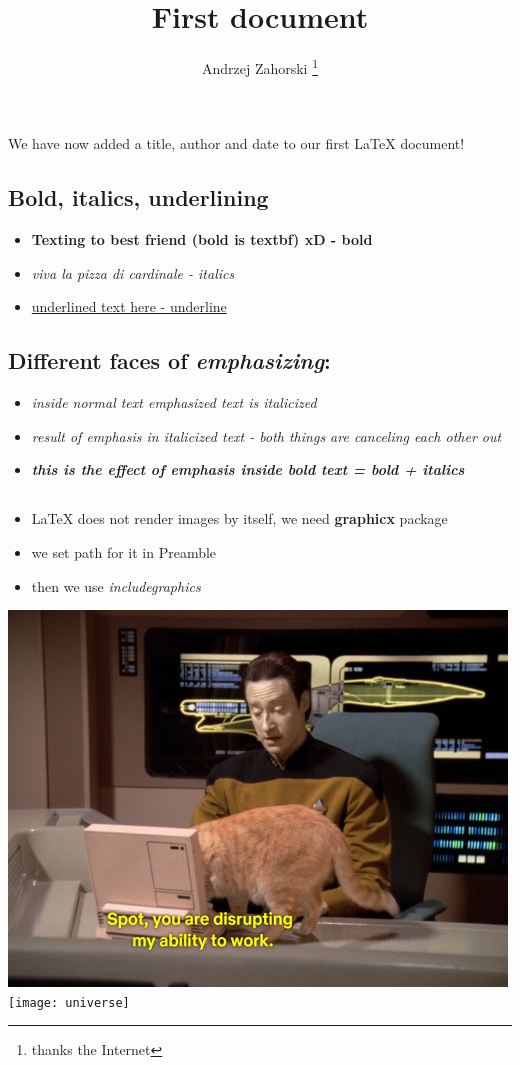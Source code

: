 \documentclass[12pt, letterpaper, twoside]{article}
\title{First document}
\author{Andrzej Zahorski \thanks{thanks the Internet}}
\begin{document}
 
\maketitle
 
We have now added a title, author and date to our first \LaTeX{} document!
\subsection{Bold, italics, underlining}
\begin{itemize}
\item \textbf{Texting to best friend (bold is textbf) xD - bold} 
\item \textit{viva la pizza di cardinale - italics} 
\item \underline{underlined text here - underline} 
\end{itemize}
\subsection{Different faces of \emph{emphasizing}:} 
\begin{itemize}
    \item \emph{inside normal text emphasized text is italicized}
    \item \textit{\emph{result of emphasis in italicized text - both things are canceling each other out}}
    \item \textbf{\emph{this is the effect of emphasis inside bold text = bold + italics}}
\end{itemize}

\subsection{}
\begin{itemize}
    \renewcommand\labelitemi{--}
    \item \LaTeX{} does not render images by itself, we need \textbf{graphicx} package
    \item  we set path for it in Preamble
    \item then we use \textit{includegraphics}
    \end{itemize}
\includegraphics[scale=0.5]{img/cat}
\texttt{[image: universe]}
\end{document}
